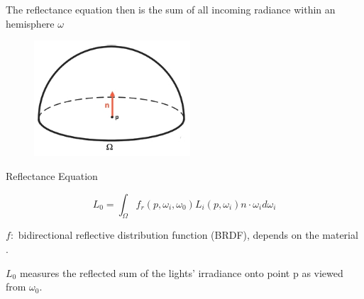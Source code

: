 \documentclass[]{beamer}
\begin{document}



\begin{frame}


  The reflectance equation then is the sum of all incoming radiance  within an hemisphere $\omega$

\vspace{5mm}
\pause

  \begin{figure}[h!]
    \begin{center}
      \includegraphics[height=1.7in]{images/20.jpg}
    \end{center}
  \end{figure}
  
  
  \end{frame}




\begin{frame}
  \textcolor{mypink1}{Reflectance Equation} 
\pause
\vspace{5mm}
                                                

\begin{equation*}
  L_0=\int_{\Omega}f_r(p,\omega_i,\omega_0)L_i(p,\omega_i)n\cdot\omega_id\omega_i
\end{equation*}

\vspace{5mm}

\pause
$f:$ bidirectional reflective distribution function (BRDF), depends on the material .
\pause
\vspace{5mm}

$L_0$  measures the reflected sum of the lights' irradiance onto point p as viewed from $\omega_0$.

\end{frame}
\end{document}
